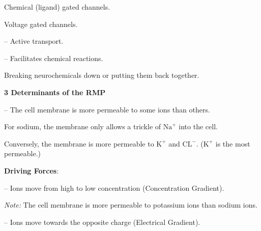 \begin{coloredlist}
\begin{coloredlist}
\begin{coloredlist}
\begin{coloredlist}
\begin{coloredlist}
\begin{coloredlist}
\begin{coloredlist}
                            \item Chemical (ligand) gated channels.
                            \item Voltage gated channels.
                        \end{coloredlist}
                    \end{coloredlist}
                    \item {} -- Active transport.
                    \item {} -- Facilitates chemical reactions.
                    \begin{coloredlist}
                        \item Breaking neurochemicals down or putting them back together.
                    \end{coloredlist}
                \end{coloredlist}
            \end{coloredlist}
        \end{coloredlist}
        \item \textbf{3 Determinants of the RMP}
        \begin{coloredlist}
            \item {} -- The cell membrane is more permeable to some ions than others.
            \begin{coloredlist}
                \item For sodium, the membrane only allows a trickle of \(\text{Na}^{+}\) into the cell.
                \item Conversely, the membrane is more permeable to \(\text{K}^{+}\) and \(\text{CL}^{-}\). (\(\text{K}^{+}\) is the most permeable.)
            \end{coloredlist}
            \item \textbf{Driving Forces}:
            \begin{coloredlist}
                \item {} -- Ions move from high to low concentration (Concentration Gradient).
                \begin{coloredlist}
                    \item \textit{Note:} The cell membrane is more permeable to potassium ions than sodium ions.
                \end{coloredlist}
                \item {} -- Ions move towards the opposite charge (Electrical Gradient).

\end{coloredlist}
\end{coloredlist}
\end{coloredlist}
\end{coloredlist}
